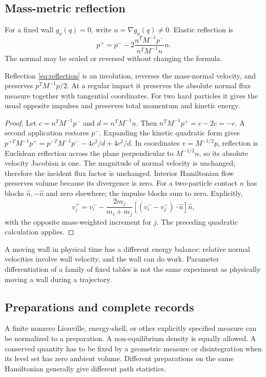 \subsection{Mass-metric reflection}
For a fixed wall $g_a(q)=0$, write $n=\nabla g_a(q)\ne0$. Elastic reflection is
\begin{equation}
 p^+=p^--2\frac{n^TM^{-1}p^-}{n^TM^{-1}n}n.
 \label{eq:reflection}
\end{equation}
The normal may be scaled or reversed without changing the formula.

\begin{proposition}\label{prop:reflection}
Reflection \eqref{eq:reflection} is an involution, reverses the mass-normal velocity, and preserves $p^TM^{-1}p/2$. At a regular impact it preserves the absolute normal flux measure together with tangential coordinates. For two hard particles it gives the usual opposite impulses and preserves total momentum and kinetic energy.
\end{proposition}
\begin{proof}
Let $c=n^TM^{-1}p^-$ and $d=n^TM^{-1}n$. Then $n^TM^{-1}p^+=c-2c=-c$. A second application restores $p^-$. Expanding the kinetic quadratic form gives
$p^{+T}M^{-1}p^+=p^{-T}M^{-1}p^- -4c^2/d+4c^2/d$.
In coordinates $v=M^{-1/2}p$, reflection is Euclidean reflection across the plane perpendicular to $M^{-1/2}n$, so its absolute velocity Jacobian is one. The magnitude of normal velocity is unchanged; therefore the incident flux factor is unchanged. Interior Hamiltonian flow preserves volume because its divergence is zero. For a two-particle contact $n$ has blocks $\widehat n,-\widehat n$ and zero elsewhere; the impulse blocks sum to zero. Explicitly,
\[
 v_i^+=v_i^- -\frac{2m_j}{m_i+m_j}[(v_i^--v_j^-)\cdot\widehat n]\widehat n,
\]
with the opposite mass-weighted increment for $j$. The preceding quadratic calculation applies.
\end{proof}

A moving wall in physical time has a different energy balance: relative normal velocities involve wall velocity, and the wall can do work. Parameter differentiation of a family of fixed tables is not the same experiment as physically moving a wall during a trajectory.

\subsection{Preparations and complete records}
A finite nonzero Liouville, energy-shell, or other explicitly specified measure can be normalized to a preparation. A non-equilibrium density is equally allowed. A conserved quantity has to be fixed by a geometric measure or disintegration when its level set has zero ambient volume. Different preparations on the same Hamiltonian generally give different path statistics.

